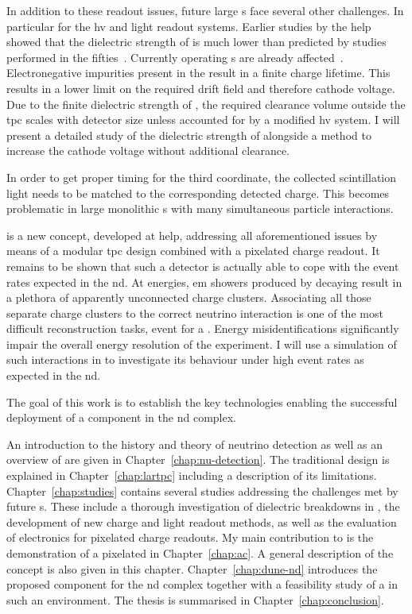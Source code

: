 In addition to these readout issues, future large \lartpc{}s face several other challenges.
In particular for the \gls{hv} and light readout systems.
Earlier studies by the \gls{help}~\cite{breakdown_14} showed that the dielectric strength of \lar{} is much lower than predicted by studies performed in the fifties~\cite{swan1, swan2}.
Currently operating \lartpc{}s are already affected~\cite{uboone}.
Electronegative impurities present in the \lar{} result in a finite charge lifetime.
This results in a lower limit on the required drift field and therefore cathode voltage.
Due to the finite dielectric strength of \lar{}, the required clearance volume outside the \gls{tpc} scales with detector size unless accounted for by a modified \gls{hv} system.
I will present a detailed study of the dielectric strength of \lar{} alongside a method to increase the cathode voltage without additional clearance.

In order to get proper timing for the third coordinate, the collected scintillation light needs to be matched to the corresponding detected charge.
This becomes problematic in large monolithic \lartpc{}s with many simultaneous particle interactions.

\AC{} is a new \lartpc{} concept, developed at \gls{help}, addressing all aforementioned issues by means of a modular \gls{tpc} design combined with a pixelated charge readout.
It remains to be shown that such a detector is actually able to cope with the event rates expected in the \dune{} \gls{nd}.
At \dune{} energies, \gls{em} showers produced by decaying \Pgpz result in a plethora of apparently unconnected charge clusters.
Associating all those separate charge clusters to the correct neutrino interaction is one of the most difficult reconstruction tasks, event for a \lartpc{}.
Energy misidentifications significantly impair the overall energy resolution of the experiment.
I will use a simulation of such interactions in \AC{} to investigate its behaviour under high event rates as expected in the \dune{} \gls{nd}.

The goal of this work is to establish the key technologies enabling the successful deployment of a \lartpc{} component in the \dune{} \gls{nd} complex.

An introduction to the history and theory of neutrino detection as well as an overview of \dune{} are given in Chapter~\ref{chap:nu-detection}.
The traditional \lartpc{} design is explained in Chapter~\ref{chap:lartpc} including a description of its limitations.
Chapter~\ref{chap:studies} contains several studies addressing the challenges met by future \lartpc{}s.
These include a thorough investigation of dielectric breakdowns in \lar{}, the development of new charge and light readout methods, as well as the evaluation of electronics for pixelated charge readouts.
My main contribution to \AC{} is the demonstration of a pixelated \lartpc{} in Chapter~\ref{chap:ac}.
A general description of the \AC{} concept is also given in this chapter.
Chapter~\ref{chap:dune-nd} introduces the proposed \AC{} component for the \dune{} \gls{nd} complex together with a feasibility study of a \lartpc{} in such an environment.
The thesis is summarised in Chapter~\ref{chap:conclusion}.
